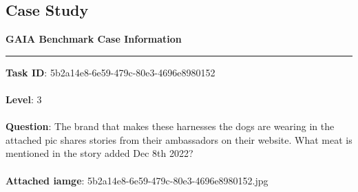 \subsection{Case Study}
\label{case_study}

\begin{mdframed}[backgroundcolor=white!10,linecolor=black,linewidth=2pt,roundcorner=8pt]
    \textbf{\color{black!80}GAIA Benchmark Case Information}
    \vspace{5pt}
    \hrule
    \vspace{8pt}
    \textbf{Task ID}: 5b2a14e8-6e59-479c-80e3-4696e8980152 \\ \\
    \textbf{Level}: 3 \\ \\
    \textbf{Question}: The brand that makes these harnesses the dogs are wearing in the attached pic shares stories from their ambassadors on their website. What meat is mentioned in the story added Dec 8th 2022? \\ \\
    \textbf{Attached iamge}: 5b2a14e8-6e59-479c-80e3-4696e8980152.jpg
\end{mdframed}

